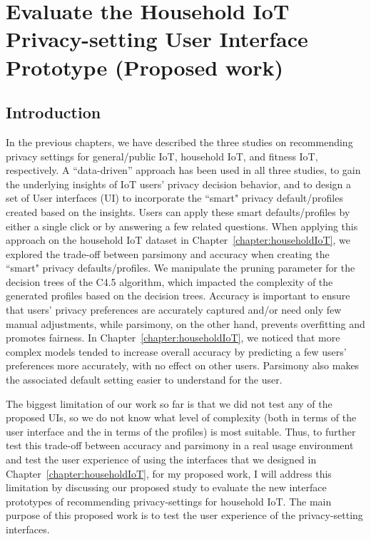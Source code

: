 \chapter{Evaluate the Household IoT Privacy-setting User Interface Prototype (Proposed work)}\label{chapter:evaluation}

\section{Introduction}

In the previous chapters, we have described the three studies on recommending privacy settings for general/public IoT, household IoT, and fitness IoT, respectively. A ``data-driven” approach has been used in all three studies, to gain the underlying insights of IoT users' privacy decision behavior, and to design a set of User interfaces (UI) to incorporate the ``smart" privacy default/profiles created based on the insights. Users can apply these smart defaults/profiles by either a single click or by answering a few related questions. When applying this approach on the household IoT dataset in Chapter~\ref{chapter:householdIoT}, we explored the trade-off between parsimony and accuracy when creating the ``smart" privacy defaults/profiles. We manipulate the pruning parameter for the decision trees of the C4.5 algorithm, which impacted the complexity of the generated profiles based on the decision trees. Accuracy is important to ensure that users' privacy preferences are accurately captured and/or need only few manual adjustments, while parsimony, on the other hand, prevents overfitting and promotes fairness. In Chapter~\ref{chapter:householdIoT}, we noticed that more complex models tended to increase overall accuracy by predicting a few users' preferences more accurately, with no effect on other users. Parsimony also makes the associated default setting easier to understand for the user. 

The biggest limitation of our work so far is that we did not test any of the proposed UIs, so we do not know what level of complexity (both in terms of the user interface and the in terms of the profiles) is most suitable. Thus, to further test this trade-off between accuracy and parsimony in a real usage environment and test the user experience of using the interfaces that we designed in Chapter~\ref{chapter:householdIoT}, for my proposed work, I will address this limitation by discussing our proposed study to evaluate the new interface prototypes of recommending privacy-settings for household IoT. The main purpose of this proposed work is to test the user experience of the privacy-setting interfaces.

